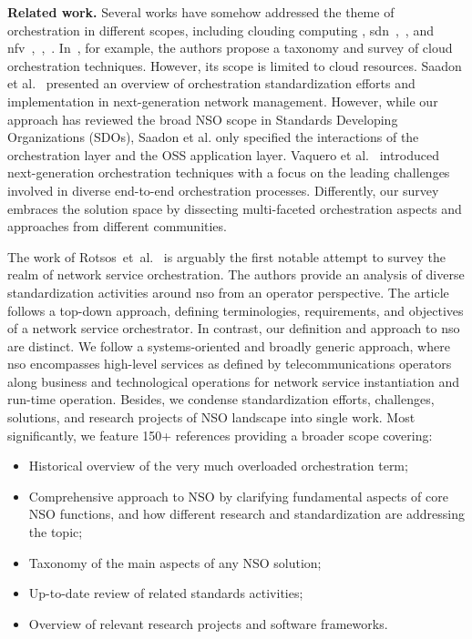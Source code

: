 \noindent \textbf{Related work.} Several works have somehow addressed the theme of orchestration in different scopes, including clouding computing \cite{Weerasiri2017}, \gls{sdn}~\cite{Jarraya2014},~\cite{surveySDN}, and \gls{nfv}~\cite{YongLi2015Software-DefinedSurvey},~\cite{Mijumbi2016NetworkChallenges},~\cite{Bhamare2016}. In~\cite{Weerasiri2017}, for example, the authors propose a taxonomy and survey of cloud orchestration techniques. However, its scope is limited to cloud resources. Saadon et al.~\cite{SAADON201917} presented an overview of orchestration standardization efforts and implementation in next-generation network management. However, while our approach has reviewed the broad NSO scope in Standards Developing Organizations (SDOs), Saadon et al. only specified the interactions of the orchestration layer and the OSS application layer. Vaquero et al.~\cite{VAQUERO201920} introduced next-generation orchestration techniques with a focus on the leading challenges  involved in diverse end-to-end orchestration processes. Differently, our survey  embraces the solution space by dissecting multi-faceted orchestration aspects and approaches from different communities.  

The work of Rotsos~et~al.~\cite{Rotsos2017NetworkSurvey} is arguably the first notable attempt to survey the realm of network service orchestration. The authors provide an analysis of diverse standardization activities around \gls{nso} from an operator perspective. The article follows a top-down approach, defining terminologies, requirements, and objectives of a network service orchestrator. 
In contrast, our definition and approach to \gls{nso} are distinct. We follow a systems-oriented and broadly generic approach,  where \gls{nso} encompasses high-level services as defined by telecommunications operators along business and technological operations for network service instantiation and run-time operation. Besides, we condense standardization efforts, challenges, solutions, and research projects of NSO landscape into single work. Most significantly, we feature 150+ references providing a broader scope covering:
\begin{itemize}
\item Historical overview of the very much overloaded orchestration term;
\item Comprehensive approach to NSO by clarifying fundamental aspects of core NSO functions, and how different research and standardization are addressing the topic;
\item Taxonomy of the main aspects of any NSO solution;
\item Up-to-date review of related standards activities;
\item Overview of relevant research projects and software frameworks.
\end{itemize}

